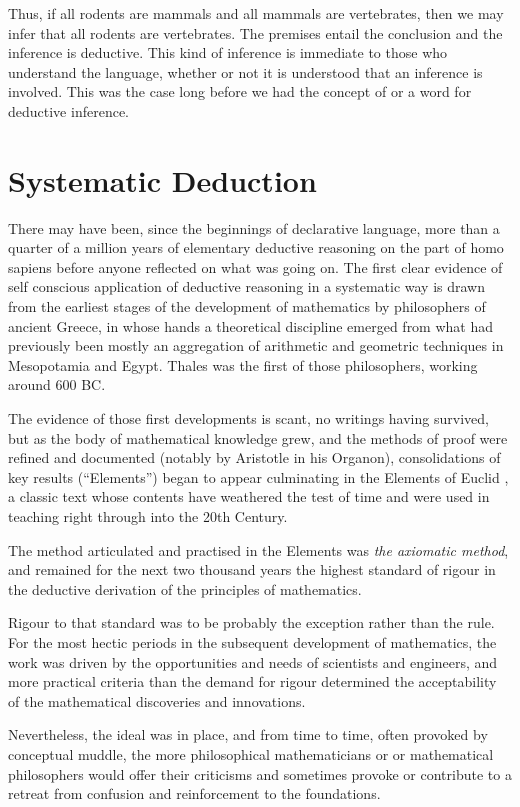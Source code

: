 \documentclass[10pt,titlepage]{book}
\begin{document}
Thus, if all rodents are mammals and all mammals are vertebrates, then we may infer that all rodents are vertebrates.
The premises entail the conclusion and the inference is deductive.
This kind of inference is immediate to those who understand the language, whether or not it is understood that an inference is involved.
This was the case long before we had the concept of or a word for deductive inference.

\section{Systematic Deduction}

There may have been, since the beginnings of declarative language, more than a quarter of a million years of elementary deductive reasoning on the part of homo sapiens before anyone reflected on what was going on.
The first clear evidence of self conscious application of deductive reasoning in a systematic way is drawn from the earliest stages of the development of mathematics by philosophers of ancient Greece, in whose hands a theoretical discipline emerged from what had previously been mostly an aggregation of arithmetic and geometric techniques in Mesopotamia and Egypt.
Thales was the first of those philosophers, working around 600 BC.

The evidence of those first developments is scant, no writings having survived, but as the body of mathematical knowledge grew, and the methods of proof were refined and documented (notably by Aristotle in his Organon), consolidations of key results (``Elements'') began to appear culminating in the Elements of Euclid \cite{euclidEL1}, a classic text whose contents have weathered the test of time and were used in teaching right through into the 20th Century.

The method articulated and practised in the Elements was \emph{the axiomatic method}, and remained for the next two thousand years the highest standard of rigour in the deductive derivation of the principles of mathematics.

Rigour to that standard was to be probably the exception rather than the rule.
For the most hectic periods in the subsequent development of mathematics, the work was driven by the opportunities and needs of scientists and engineers, and more practical criteria than the demand for rigour determined the acceptability of the mathematical discoveries and innovations.

Nevertheless, the ideal was in place, and from time to time, often provoked by conceptual muddle, the more philosophical mathematicians or or mathematical philosophers would offer their criticisms and sometimes provoke or contribute to a retreat from confusion and reinforcement to the foundations.
\end{document}
